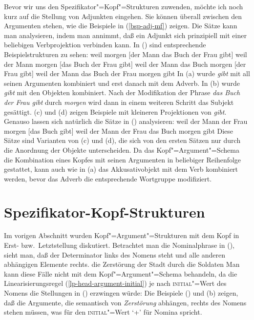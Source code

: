Bevor wir uns den Spezifikator"=Kopf"=Strukturen zuwenden, möchte ich noch kurz
auf die Stellung von Adjunkten eingehen. Sie können überall zwischen den Argumenten
stehen, wie die Beispiele in (\ref{bsp-adj-mf}) zeigen. Die Sätze kann man analysieren,
indem man annimmt, daß ein Adjunkt sich prinzipiell mit einer beliebigen Verbprojektion
verbinden kann. In () sind entsprechende Beispielstrukturen zu sehen:
\eal
\label{bsp-adj-mf-zwei}
\ex weil morgen [der Mann das Buch der Frau gibt]
\ex weil der Mann morgen [das Buch der Frau gibt]
\ex weil der Mann das Buch morgen [der Frau gibt]
\ex weil der Mann das Buch der Frau morgen gibt
\zl
In (a) wurde \emph{gibt} mit all seinen Argumenten kombiniert und erst danach
mit dem Adverb. In (b) wurde \emph{gibt} mit den Objekten kombiniert. Nach der
Modifikation der Phrase \emph{das Buch der Frau gibt} durch \emph{morgen} wird dann
in einem weiteren Schritt das Subjekt gesättigt. (c) und (d) zeigen Beispiele mit kleineren
Projektionen von \emph{gibt}. Genauso lassen sich natürlich die Sätze in ()
analysieren:
\eal
\ex weil der Mann der Frau morgen [das Buch gibt]
\ex weil der Mann der Frau das Buch morgen gibt
\zl
Diese Sätze sind Varianten von (c) und (d), die sich von den ersten Sätzen
nur durch die Anordnung der Objekte unterscheiden. Da das Kopf"=Argument"=Schema die Kombination
eines Kopfes mit seinen Argumenten in beliebiger Reihenfolge gestattet, kann auch wie in (a)
das Akkusativobjekt mit dem Verb kombiniert werden, bevor das Adverb die entsprechende Wortgruppe
modifiziert.%


\section{Spezifikator-Kopf-Strukturen}
\label{sec-spr}

Im vorigen Abschnitt wurden Kopf"=Argument"=Strukturen mit dem Kopf in Erst-
bzw.\ Letztstellung diskutiert. Betrachtet man die Nominalphrase in (),
sieht man, daß der Determinator links des Nomens steht und alle anderen abhängigen
Elemente rechts.
\ea
\label{ex-die-zerstoerung-der-stadt-dds}
die Zerstörung der Stadt durch die Soldaten
\z
Man kann diese Fälle nicht mit dem Kopf"=Argument"=Schema behandeln, da die Linearisierungsregel
(\ref{lp-head-argument-initial}) je nach \textsc{initial}"=Wert des Nomens die Stellungen in ()
erzwingen würde:
\eal
{}
\zl
Die Beispiele () und (b) zeigen, daß die Argumente, die semantisch von \emph{Zerstörung} abhängen, rechts des
Nomens stehen müssen, was für den \textsc{initial}"=Wert `+' für Nomina spricht.

